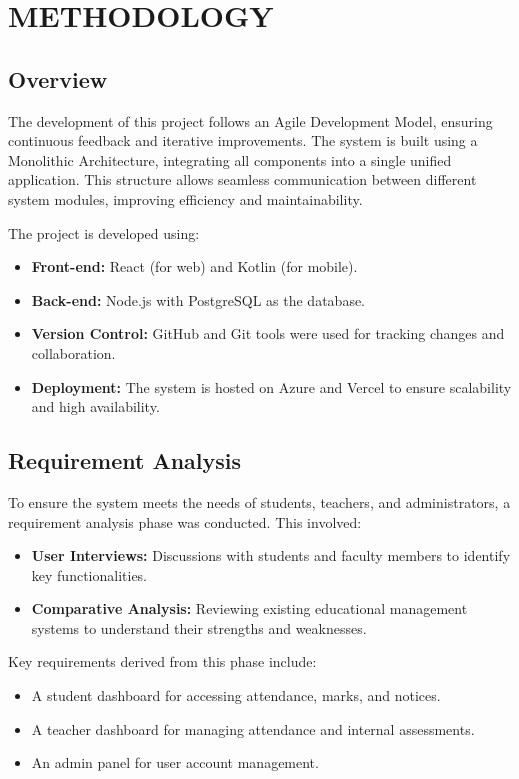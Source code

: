 \chapter{METHODOLOGY}

\section{Overview}
The development of this project follows an Agile Development Model, ensuring continuous feedback and iterative improvements. The system is built using a Monolithic Architecture, integrating all components into a single unified application. This structure allows seamless communication between different system modules, improving efficiency and maintainability.

The project is developed using:
\begin{itemize}
    \item \textbf{Front-end:} React (for web) and Kotlin (for mobile).
    \item \textbf{Back-end:} Node.js with PostgreSQL as the database.
    \item \textbf{Version Control:} GitHub and Git tools were used for tracking changes and collaboration.
    \item \textbf{Deployment:} The system is hosted on Azure and Vercel to ensure scalability and high availability.
\end{itemize}

\section{Requirement Analysis}
To ensure the system meets the needs of students, teachers, and administrators, a requirement analysis phase was conducted. This involved:
\begin{itemize}
    \item \textbf{User Interviews:} Discussions with students and faculty members to identify key functionalities.
    \item \textbf{Comparative Analysis:} Reviewing existing educational management systems to understand their strengths and weaknesses.
\end{itemize}

Key requirements derived from this phase include:
\begin{itemize}
    \item A student dashboard for accessing attendance, marks, and notices.
    \item A teacher dashboard for managing attendance and internal assessments.
    \item An admin panel for user account management.
\end{itemize}

